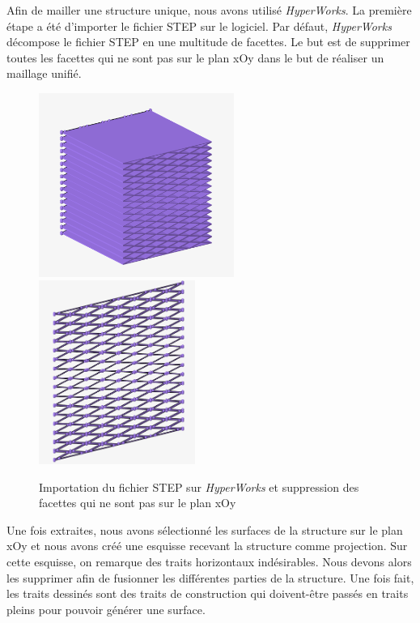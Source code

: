 \documentclass[a4paper]{article}
\begin{document}
	\hspace{0.5cm}Afin de mailler une structure unique, nous avons utilisé \textit{HyperWorks}. La première étape a été d’importer le fichier STEP sur le logiciel. Par défaut, \textit{HyperWorks} décompose le fichier STEP en une multitude de facettes. Le but est de supprimer toutes les facettes qui ne sont pas sur le plan xOy dans le but de réaliser un maillage unifié.
	
	\begin{figure}[H]
		\centering
		\includegraphics[height=6cm]{Images/8/8_1/hm_step.png}
		\includegraphics[height=6cm]{Images/8/8_1/hm_xoy.png}\\
		\caption{Importation du fichier STEP sur \textit{\textit{HyperWorks}} et suppression des facettes qui ne sont pas sur le plan xOy}
	\end{figure}
	\newpage
	
	\hspace{0.5cm}Une fois extraites, nous avons sélectionné les surfaces de la structure sur le plan xOy et nous avons créé une esquisse recevant la structure comme projection. Sur cette esquisse, on remarque des traits horizontaux indésirables. Nous devons alors les supprimer afin de fusionner les différentes parties de la structure. Une fois fait, les traits dessinés sont des traits de construction qui doivent-être passés en traits pleins pour pouvoir générer une surface.
	
\end{document}
